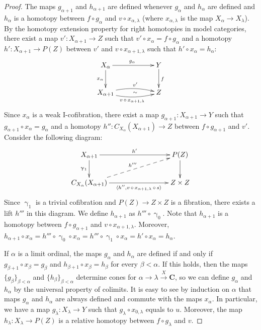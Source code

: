 \documentclass{tac}
\theoremstyle{definition}
\newcommand{\cat}[1]{\mathbf{#1}}
\newcommand{\C}{\cat{C}}
\newcommand{\I}{\mathrm{I}}
\newcommand{\cyli}{\upgamma}
\begin{document}
\begin{proof}
The maps $g_{\alpha+1}$ and $h_{\alpha+1}$ are defined whenever $g_\alpha$ and $h_\alpha$ are defined and
$h_\alpha$ is a homotopy between $f \circ g_\alpha$ and $v \circ x_{\alpha,\lambda}$ (where $x_{\alpha,\lambda}$ is the map $X_\alpha \to X_\lambda$).
By the homotopy extension property for right homotopies in model categories, there exist a map $v' : X_{\alpha+1} \to Z$ such that $v' \circ x_\alpha = f \circ g_\alpha$
and a homotopy $h' : X_{\alpha+1} \to P(Z)$ between $v'$ and $v \circ x_{\alpha+1,\lambda}$ such that $h' \circ x_\alpha = h_\alpha$:
\[ \xymatrix{ X_\alpha \ar[rr]^{g_\alpha} \ar[d]_{x_\alpha}                                                & & Y \ar[d]^f \\
              X_{\alpha+1} \ar@/^/[rr]^-{v'} \ar@/_/[rr]_{v\,\circ\,x_{\alpha+1,\lambda}} \ar@{}[rr]|-{\sim} & & Z
            } \]
Since $x_\alpha$ is a weak $\I$-cofibration, there exist a map $g_{\alpha+1} : X_{\alpha+1} \to Y$ such that $g_{\alpha+1} \circ x_\alpha = g_\alpha$
and a homotopy $h'' : C_{X_\alpha}(X_{\alpha+1}) \to Z$ between $f \circ g_{\alpha+1}$ and $v'$.
Consider the following diagram:
\[ \xymatrix{ X_{\alpha+1} \ar[rrr]^{h'} \ar[d]_{\cyli_1}                                                                                 & & & P(Z) \ar[d] \\
              C_{X_\alpha}(X_{\alpha+1}) \ar[rrr]_-{\langle h'', v\,\circ\,x_{\alpha+1,\lambda}\,\circ\,s \rangle} \ar@{-->}[rrru]^{h'''} & & & Z \times Z
            } \]
Since $\cyli_1$ is a trivial cofibration and $P(Z) \to Z \times Z$ is a fibration, there exists a lift $h'''$ in this diagram.
We define $h_{\alpha+1}$ as $h''' \circ \cyli_0$.
Note that $h_{\alpha+1}$ is a homotopy between $f \circ g_{\alpha+1}$ and $v \circ x_{\alpha+1,\lambda}$.
Moreover, $h_{\alpha+1} \circ x_\alpha = h''' \circ \cyli_0 \circ x_\alpha = h''' \circ \cyli_1 \circ x_\alpha = h' \circ x_\alpha = h_\alpha$.

If $\alpha$ is a limit ordinal, the maps $g_\alpha$ and $h_\alpha$ are defined if and only if $g_{\beta+1} \circ x_\beta = g_\beta$ and $h_{\beta+1} \circ x_\beta = h_\beta$ for every $\beta < \alpha$.
If this holds, then the maps $\{ g_\beta \}_{\beta < \alpha}$ and $\{ h_\beta \}_{\beta < \alpha}$ determine cones for $\alpha \to \lambda \xrightarrow{X} \C$,
so we can define $g_\alpha$ and $h_\alpha$ by the universal property of colimits.
It is easy to see by induction on $\alpha$ that maps $g_\alpha$ and $h_\alpha$ are always defined and commute with the maps $x_\alpha$.
In particular, we have a map $g_\lambda : X_\lambda \to Y$ such that $g_\lambda \circ x_{0,\lambda}$ equals to $u$.
Moreover, the map $h_\lambda : X_\lambda \to P(Z)$ is a relative homotopy between $f \circ g_\lambda$ and $v$.


\end{proof}
\end{document}
